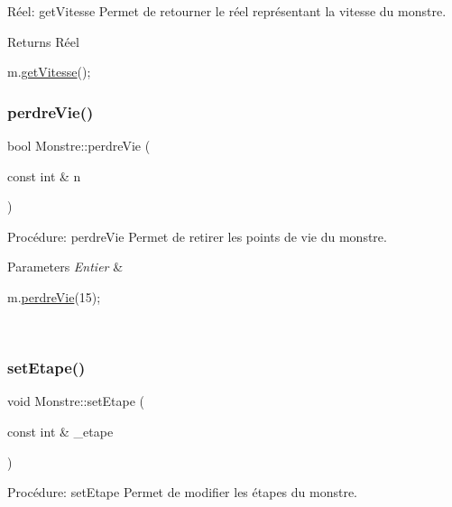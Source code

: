 Réel\+: get\+Vitesse Permet de retourner le réel représentant la vitesse du monstre. 

\begin{DoxyReturn}{Returns}
Réel 
\begin{DoxyCode}
m.\hyperlink{classMonstre_a8f94de3aed809fd81f283afce7c3feba}{getVitesse}();
\end{DoxyCode}
 
\end{DoxyReturn}
\mbox{\label{classMonstre_af6d0a1f276465d12d50db387855e62d3}} 
\subsubsection{\texorpdfstring{perdre\+Vie()}{perdreVie()}}
{\footnotesize\ttfamily bool Monstre\+::perdre\+Vie (\begin{DoxyParamCaption}\item[{const int \&}]{n }\end{DoxyParamCaption})}



Procédure\+: perdre\+Vie Permet de retirer les points de vie du monstre. 


\begin{DoxyParams}{Parameters}
{\em Entier} & 
\begin{DoxyCode}
m.\hyperlink{classMonstre_af6d0a1f276465d12d50db387855e62d3}{perdreVie}(15);
\end{DoxyCode}
 \\
\hline
\end{DoxyParams}
\mbox{\label{classMonstre_a51895539b2db4bd6e267e0ac5a1729ce}} 
\subsubsection{\texorpdfstring{set\+Etape()}{setEtape()}}
{\footnotesize\ttfamily void Monstre\+::set\+Etape (\begin{DoxyParamCaption}\item[{const int \&}]{\+\_\+etape }\end{DoxyParamCaption})}



Procédure\+: set\+Etape Permet de modifier les étapes du monstre. 


